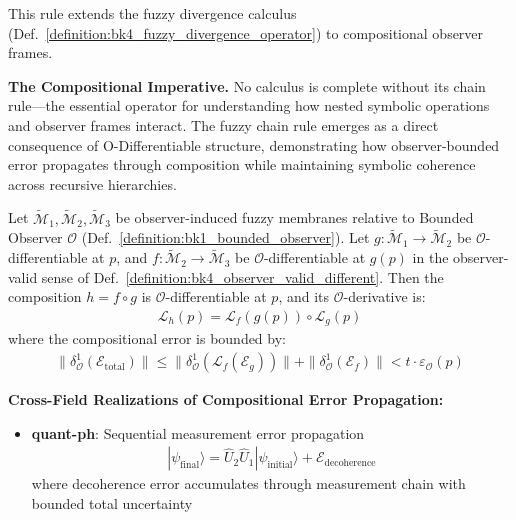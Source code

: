 This rule extends the fuzzy divergence calculus (Def.~\ref{definition:bk4_fuzzy_divergence_operator}) to compositional observer frames.

\textbf{The Compositional Imperative.} No calculus is complete without its chain rule---the essential operator for understanding how nested symbolic operations and observer frames interact. The fuzzy chain rule emerges as a direct consequence of O-Differentiable structure, demonstrating how observer-bounded error propagates through composition while maintaining symbolic coherence across recursive hierarchies.



\begin{theorem}
\label{theorem:bk4_fuzzy_chain_rule}
Let $\tilde{\mathcal{M}}_1, \tilde{\mathcal{M}}_2, \tilde{\mathcal{M}}_3$ be observer-induced fuzzy membranes relative to Bounded Observer $\mathcal{O}$ (Def.~\ref{definition:bk1_bounded_observer}). Let $g: \tilde{\mathcal{M}}_1 \rightarrow \tilde{\mathcal{M}}_2$ be $\mathcal{O}$-differentiable at $p$, and $f: \tilde{\mathcal{M}}_2 \rightarrow \tilde{\mathcal{M}}_3$ be $\mathcal{O}$-differentiable at $g(p)$ in the observer-valid sense of Def.~\ref{definition:bk4_observer_valid_different}. Then the composition $h = f \circ g$ is $\mathcal{O}$-differentiable at $p$, and its $\mathcal{O}$-derivative is:
\begin{align}
\mathcal{L}_h(p) = \mathcal{L}_f(g(p)) \circ \mathcal{L}_g(p)
\end{align}
where the compositional error is bounded by:
\begin{align}
\|\delta^1_{\mathcal{O}}(\mathcal{E}_{\text{total}})\| \leq \|\delta^1_{\mathcal{O}}(\mathcal{L}_f(\mathcal{E}_g))\| + \|\delta^1_{\mathcal{O}}(\mathcal{E}_f)\| < t \cdot \varepsilon_{\mathcal{O}}(p)
\end{align}

\textbf{Cross-Field Realizations of Compositional Error Propagation:}

\begin{itemize}
\item \textbf{quant-ph}: Sequential measurement error propagation
  \begin{align}
  |\psi_{\text{final}}\rangle = \hat{U}_2 \hat{U}_1 |\psi_{\text{initial}}\rangle + \mathcal{E}_{\text{decoherence}}
  \end{align}
  where decoherence error accumulates through measurement chain with bounded total uncertainty
  

\end{itemize}
\end{theorem}
